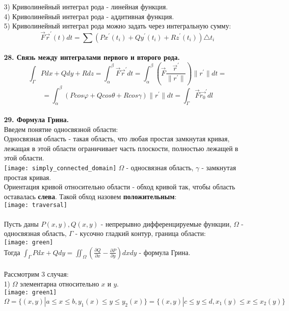 \documentclass[12pt]{article}
\begin{document}
3) Криволинейный интеграл  рода - линейная функция.\\
4) Криволинейный интеграл  рода - аддитивная функция.\\
5) Криволинейный интеграл  рода можно задать через интегральную сумму:\\
$$\overrightarrow{F} \overrightarrow{r}^{'}(t) dt = \sum (Px^{'}(t_i) + Qy^{'}(t_i) + Rz^{'}(t_i)){\bigtriangleup t_i}$$
\\
\label{question28}\textbf{28. Связь между интегралами первого и второго рода.}\\
$$\int_\Gamma Pdx+Qdy+Rdz = \int_\alpha^\beta \overrightarrow{F} \overrightarrow{r}^{'} dt = \int_\alpha^\beta (\overrightarrow{F} \frac{\overrightarrow{r}^{'}}{\|r^{'} \|})\|r^{'} \|dt =$$
$$=\int_\alpha^\beta(Pcos\varphi+Qcos\theta+Rcos\gamma)\|r^{'} \|dt=\int_\Gamma \overrightarrow{F} \overrightarrow{r_0}^{'} dl$$
\\
\label{question29_1}\textbf{29. Формула Грина.}\\
Введем понятие односвязной области:\\
Односвязная область - такая область, что любая простая замкнутая кривая, лежащая в этой области ограничивает часть плоскости, полностью лежащей в этой области.\\
\texttt{[image: simply\_connected\_domain]} $\Omega$ - односвязная область, $\gamma$ - замкнутая простая кривая.\\
Ориентация кривой относительно области - обход кривой так, чтобы область оставалась \textbf{слева}. Такой обход назовем \textbf{положительным}:\\
\texttt{[image: traversal]}\\
\\
Пусть даны $P(x,y), Q(x,y)$ - непрерывно дифференцируемые функции, $\Omega$ - односвязная область, $\Gamma$ - кусочно гладкий контур, граница области:\\
\texttt{[image: green]}\\
Тогда $\int_\Gamma Pdx+Qdy = \iint_\Omega (\frac{\partial Q}{\partial x} - \frac{\partial P}{\partial y}) dxdy$ - формула Грина.\\
\\
Рассмотрим 3 случая:\\
1) $\Omega$ элементарна относительно $x$ и $y$.\\
\texttt{[image: green1]}\\
$$\Omega = \{(x,y) | a \leq x \leq b, y_1(x) \leq y \leq y_2(x) \} = \{(x,y) | c \leq y \leq d, x_1(y) \leq x \leq x_2(y) \}$$
\end{document}
